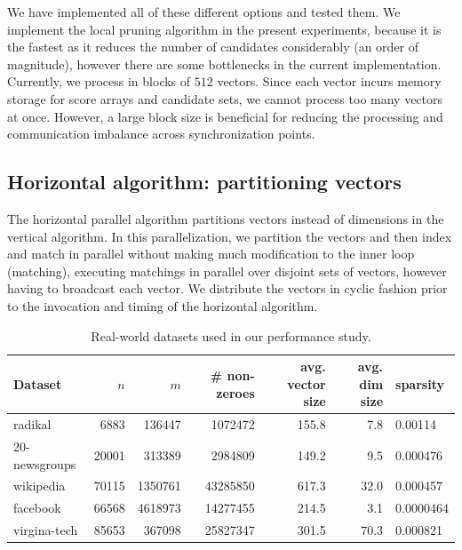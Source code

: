 \documentclass{comjnl}
\begin{document}
We have implemented all of these different options and tested them.
We implement the local pruning algorithm in the present experiments, because
it is the fastest as it reduces the number of candidates considerably
(an order of magnitude), however there are some bottlenecks in the
current implementation.  Currently, we process in blocks of $512$
vectors. Since each vector incurs memory storage for score arrays and
candidate sets, we cannot process too many vectors at once. However, a
large block size is beneficial for reducing the processing and
communication imbalance across synchronization points.

\subsection{Horizontal algorithm: partitioning vectors }
\label{sec:horiz}

The horizontal parallel algorithm partitions vectors instead of dimensions in
the vertical algorithm.  
In this parallelization, we partition the vectors and
then index and match in parallel without making much
modification to the inner loop (matching), executing matchings in
parallel over disjoint sets of vectors, however having to broadcast
each vector. 
We distribute the vectors in cyclic fashion prior to the invocation and
timing of the horizontal algorithm.



\begin{center}
  \begin{table}
    \centering
    \caption{Real-world datasets used in our performance study.}
    \begin{tabular}{l r r r r r l}
      Dataset & $n$ & $m$ & \# non-zeroes & avg. vector size & avg. dim size  & sparsity \\ \hline
      radikal & 6883 & 136447 & 1072472 & 155.8 & 7.8 & 0.00114 \\
      20-newsgroups & 20001 & 313389 & 2984809 & 149.2 & 9.5 & 0.000476\\
      wikipedia & 70115 &1350761 & 43285850 & 617.3 & 32.0 & 0.000457 \\
      facebook & 66568 & 4618973 & 14277455 & 214.5 & 3.1 &  0.0000464 \\
      virgina-tech & 85653 & 367098 & 25827347 & 301.5 & 70.3 & 0.000821
    \end{tabular}
    \label{tab:datasets}
  \end{table}
\end{center}
\end{document}
